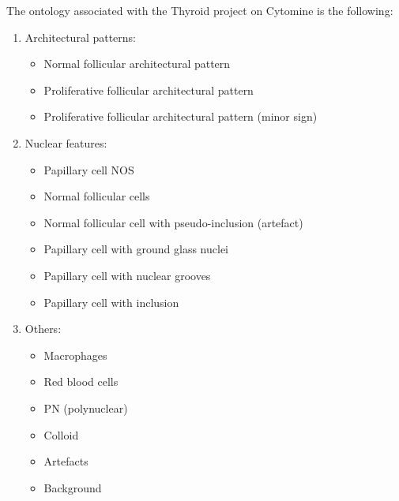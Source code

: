 \label{app:ontology}
The ontology associated with the Thyroid project on Cytomine is the following:

\begin{enumerate}
	\item Architectural patterns:
	\begin{itemize}
		\item Normal follicular architectural pattern
		\item Proliferative follicular architectural pattern
		\item Proliferative follicular architectural pattern (minor sign)
	\end{itemize}
	\item Nuclear features:
	\begin{itemize}
		\item Papillary cell NOS
		\item Normal follicular cells
		\item Normal follicular cell with pseudo-inclusion (artefact)
		\item Papillary cell with ground glass nuclei
		\item Papillary cell with nuclear grooves
		\item Papillary cell with inclusion
	\end{itemize}
	\item Others:
	\begin{itemize}
		\item Macrophages
		\item Red blood cells
		\item PN (polynuclear)
		\item Colloid
		\item Artefacts
		\item Background
	\end{itemize}
\end{enumerate}

